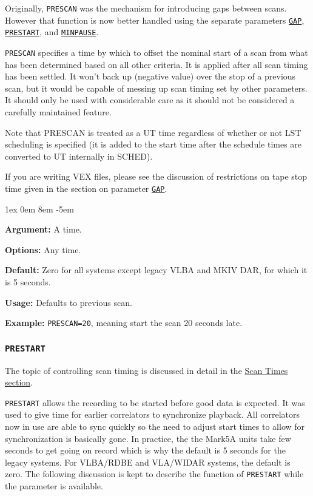 \documentclass{report}
\newcommand{\sched}{{\sc SCHED}}
\newcommand{\rcwbox}[5]{
  \begin{list}{}{\parsep 1ex  \itemsep 0em
                 \leftmargin 8em  \itemindent -5em }
    \item {\bf Argument:} #1
    \item {\bf Options:}  #2
    \item {\bf Default:}  #3
    \item {\bf Usage:}    #4
    \item {\bf Example:}  #5
  \end{list}
}
\begin{document}
Originally, {\tt PRESCAN} was the mechanism for introducing gaps
between scans.  However that function is now better handled using the
separate parameters 
{\hyperref[MP:GAP]{{\tt GAP}}}, 
{\hyperref[MP:PRESTART]{{\tt PRESTART}}}, and 
{\hyperref[MP:MINPAUSE]{{\tt MINPAUSE}}}.

{\tt PRESCAN} specifies a time by which to offset the nominal start 
of a scan from what has been determined based on all other criteria.
It is applied after all scan timing has been settled.  It won't 
back up (negative value) over the stop of a previous scan, but it
would be capable of messing up scan timing set by other parameters.
It should only be used with considerable care as it should not be
considered a carefully maintained feature.

Note that PRESCAN is treated as a UT time regardless of whether or
not LST scheduling is specified (it is added to the start time after
the schedule times are converted to UT internally in \sched).

If you are writing VEX files, please see the discussion of restrictions
on tape stop time given in the section on parameter 
{\hyperref[MP:GAP]{{\tt GAP}}}.


\rcwbox
{A time.}
{Any time.}
{Zero for all systems except legacy VLBA and MKIV DAR, for which it is
5 seconds.}
{Defaults to previous scan.}
{{\tt PRESCAN=20}, meaning start the scan 20 seconds late.}

\subsubsection{\label{MP:PRESTART}{\tt PRESTART}}

The topic of controlling scan timing is discussed in detail in
the 
{\hyperref[SSEC:SCANTIMES]{Scan Times section}}.

{\tt PRESTART} allows the recording to be started before good data is
expected.  It was used to give time for earlier correlators to
synchronize playback.  All correlators now in use are able to sync
quickly so the need to adjust start times to allow for synchronization
is basically gone.  In practice, the the Mark5A units take few seconds to get
going on record which is why the default is 5 seconds for the legacy systems.
For VLBA/RDBE and VLA/WIDAR systems, the default is zero.  The following
discussion is kept to describe the function of {\tt PRESTART} while
the parameter is available.
\end{document}
